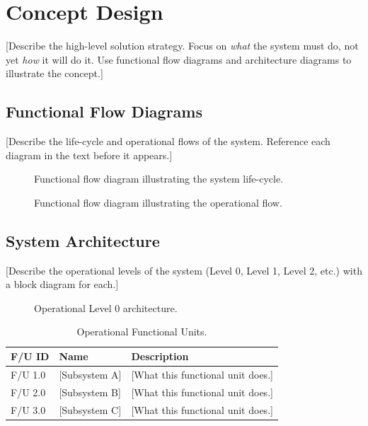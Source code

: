 \chapter{Concept Design}
\label{ch:concept}

[Describe the high-level solution strategy. Focus on \textit{what}
the system must do, not yet \textit{how} it will do it. Use
functional flow diagrams and architecture diagrams to illustrate
the concept.]

\section{Functional Flow Diagrams}
\label{sec:functional-flow}

[Describe the life-cycle and operational flows of the system.
Reference each diagram in the text before it appears.]

\begin{figure}[H]
    \centering
    \caption{Functional flow diagram illustrating the system life-cycle.}
    \label{fig:ffd-lifecycle}
\end{figure}

\begin{figure}[H]
    \centering
    \caption{Functional flow diagram illustrating the operational flow.}
    \label{fig:ffd-operational}
\end{figure}

\section{System Architecture}
\label{sec:architecture}

[Describe the operational levels of the system (Level 0, Level 1,
Level 2, etc.) with a block diagram for each.]

\begin{figure}[H]
    \centering
    \caption{Operational Level 0 architecture.}
    \label{fig:arch-l0}
\end{figure}

\begin{table}[H]
    \centering
    \caption{Operational Functional Units.}
    \label{tab:functional-units}
    \begin{tabular}{@{} l l p{7cm} @{}}
        \toprule
        \textbf{F/U ID} & \textbf{Name} & \textbf{Description} \\
        \midrule
        F/U 1.0 & [Subsystem A] & [What this functional unit does.] \\
        F/U 2.0 & [Subsystem B] & [What this functional unit does.] \\
        F/U 3.0 & [Subsystem C] & [What this functional unit does.] \\
        \bottomrule
    \end{tabular}
\end{table}

